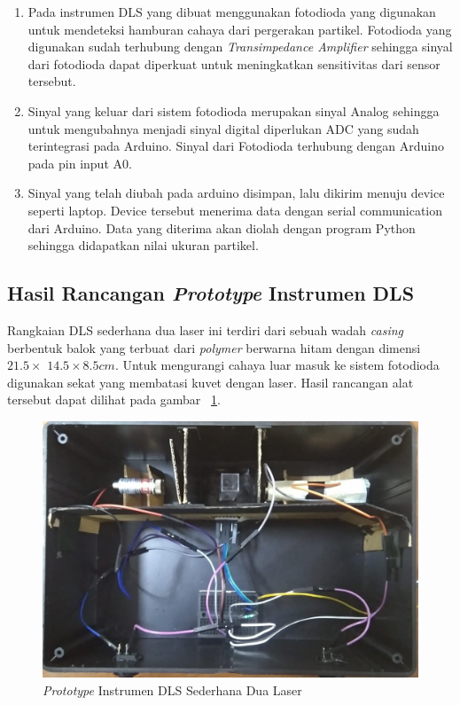 \begin{enumerate}
    \item Pada instrumen DLS yang dibuat menggunakan fotodioda yang digunakan untuk mendeteksi
    hamburan cahaya dari pergerakan partikel. Fotodioda yang digunakan sudah terhubung dengan
    \textit{Transimpedance Amplifier} sehingga sinyal dari fotodioda dapat diperkuat untuk
    meningkatkan sensitivitas dari sensor tersebut.

    \item Sinyal yang keluar dari sistem fotodioda merupakan sinyal Analog sehingga untuk
    mengubahnya menjadi sinyal digital diperlukan ADC yang sudah terintegrasi pada Arduino.
    Sinyal dari Fotodioda terhubung dengan Arduino pada pin input A0.

    \item Sinyal yang telah diubah pada arduino disimpan, lalu dikirim menuju device seperti
    laptop. Device tersebut menerima data dengan serial communication
    dari Arduino. Data yang diterima akan diolah dengan program Python sehingga
    didapatkan nilai ukuran partikel.
\end{enumerate}


\subsection{Hasil Rancangan \textit{Prototype} Instrumen DLS}
Rangkaian DLS sederhana dua laser ini terdiri dari sebuah wadah \textit{casing} berbentuk balok
yang terbuat dari \textit{polymer} berwarna hitam dengan dimensi ${21.5 \times }$
${14.5 \times 8.5cm}$. Untuk mengurangi cahaya luar masuk ke sistem fotodioda digunakan sekat
yang membatasi kuvet dengan laser. Hasil rancangan alat tersebut dapat dilihat pada gambar
~\ref{fig:prot}.
\begin{figure}[H]
    \centering
    \includegraphics[width=12cm]{Images/Rangkaian.jpg}
    \caption{\textit{Prototype} Instrumen DLS Sederhana Dua Laser}
    \label{fig:prot}
\end{figure}

